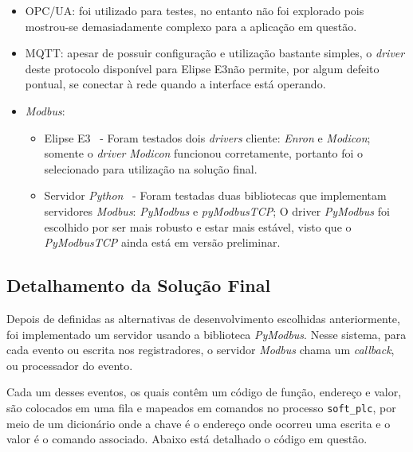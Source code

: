 \documentclass[
	article,			%
	11pt,				%
	oneside,			%
	a4paper,			%
	section=TITLE,		%
	english,			%
	brazil,				%
	sumario=tradicional
	]{abntex2}
\newcommand{\EE}{Elipse E3}%
\newcommand{\Py}{\textit{Python}}%
\newcommand{\Mb}{\textit{Modbus}}%
\begin{document}
\begin{itemize}
    \item OPC/UA: foi utilizado para testes, no entanto não foi explorado pois mostrou-se demasiadamente complexo para a aplicação em questão.
    \item MQTT: apesar de possuir configuração e utilização bastante simples, o \textit{driver} deste protocolo disponível para \EE não permite, por algum defeito pontual, se conectar à rede quando a interface está operando. %
    \item \Mb: 
    \begin{itemize}
        \item \EE~ - Foram testados dois \textit{drivers} cliente: \textit{Enron} e \textit{Modicon}; somente o \textit{driver} \textit{Modicon} funcionou corretamente, portanto foi o selecionado para utilização na solução final.
        \item Servidor \Py~ - Foram testadas duas bibliotecas que implementam servidores \Mb: \textit{PyModbus} e \textit{pyModbusTCP}; O driver \textit{PyModbus} foi escolhido por ser mais robusto e estar mais estável, visto que o \textit{PyModbusTCP} ainda está em versão preliminar.
        \end{itemize}
\end{itemize}

\subsection{Detalhamento da Solução Final}
Depois de definidas as alternativas de desenvolvimento escolhidas anteriormente, foi implementado um servidor usando a biblioteca \textit{PyModbus}. Nesse sistema, para cada evento ou escrita nos registradores, o servidor \Mb{} chama um \textit{callback}, ou processador do evento.

Cada um desses eventos, os quais contêm um código de função, endereço e valor, são colocados em uma fila e mapeados em comandos no processo \texttt{soft\_plc}, por meio de um dicionário onde a chave é o endereço onde ocorreu uma escrita e o valor é o comando associado. Abaixo está detalhado o código em questão.

\end{document}
